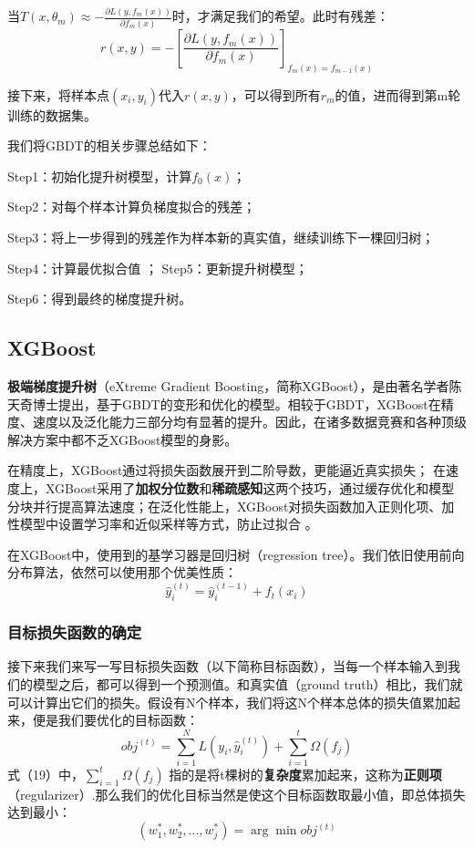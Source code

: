 当$T(x,\theta_m)\approx-\frac{\partial L(y,f_m(x))}{\partial f_m(x)}$时，才满足我们的希望。此时有残差：
\begin{equation}r(x,y)=-\left[\frac{\partial L(y,f_m(x))}{\partial f_m(x)}\right]_{f_m(x)=f_{m-1}(x)}\end{equation}

接下来，将样本点$(x_i,y_i)$代入$r(x,y)$，可以得到所有$r_{m}$的值，进而得到第m轮训练的数据集。

我们将GBDT的相关步骤总结如下：

Step1：初始化提升树模型，计算$f_0(x)$；

Step2：对每个样本计算负梯度拟合的残差；

Step3：将上一步得到的残差作为样本新的真实值，继续训练下一棵回归树；

Step4：计算最优拟合值
；
Step5：更新提升树模型；

Step6：得到最终的梯度提升树。

\subsection{XGBoost}
\textbf{极端梯度提升树}（eXtreme Gradient Boosting，简称XGBoost），是由著名学者陈天奇博士提出，基于GBDT的变形和优化的模型。相较于GBDT，XGBoost在精度、速度以及泛化能力三部分均有显著的提升。因此，在诸多数据竞赛和各种顶级解决方案中都不乏XGBoost模型的身影。

在精度上，XGBoost通过将损失函数展开到二阶导数，更能逼近真实损失；
在速度上，XGBoost采用了\textbf{加权分位数}和\textbf{稀疏感知}这两个技巧，通过缓存优化和模型分块并行提高算法速度；在泛化性能上，XGBoost对损失函数加入正则化项、加性模型中设置学习率和近似采样等方式，防止过拟合
。

在XGBoost中，使用到的基学习器是回归树（regression tree）。我们依旧使用前向分布算法，依然可以使用那个优美性质：
\begin{equation}\hat{y}_i^{(t)}=\hat{y}_i^{(t-1)}+f_t(x_i)\end{equation}
\subsubsection{目标损失函数的确定}
接下来我们来写一写目标损失函数（以下简称目标函数），当每一个样本输入到我们的模型之后，都可以得到一个预测值。和真实值（ground truth）相比，我们就可以计算出它们的损失。假设有N个样本，我们将这N个样本总体的损失值累加起来，便是我们要优化的目标函数：
\begin{equation}obj^{(t)}=\sum_{i=1}^NL(y_i,\hat{y}_i^{(t)})+\sum_{i=1}^t\Omega(f_j)\end{equation}
式（19）中，$\sum_{i=1}^t\Omega(f_j)$ 指的是将t棵树的\textbf{复杂度}累加起来，这称为\textbf{正则项}（regularizer）.那么我们的优化目标当然是使这个目标函数取最小值，即总体损失达到最小：
\begin{equation}(w_1^*,w_2^*,...,w_j^*)=\arg\min obj^{(t)}\end{equation}

